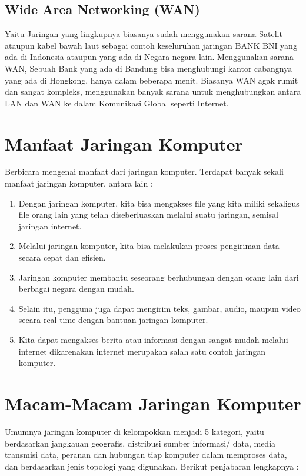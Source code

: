   \subsection{Wide Area Networking (WAN)}
    Yaitu Jaringan yang lingkupnya biasanya sudah menggunakan sarana Satelit ataupun kabel bawah laut sebagai contoh keseluruhan jaringan BANK BNI yang ada di Indonesia ataupun yang ada di Negara-negara lain. Menggunakan sarana WAN, Sebuah Bank yang ada di Bandung bisa menghubungi kantor cabangnya yang ada di Hongkong, hanya dalam beberapa menit. Biasanya WAN agak rumit dan sangat kompleks, menggunakan banyak sarana untuk menghubungkan antara LAN dan WAN ke dalam Komunikasi Global seperti Internet.

\section{Manfaat Jaringan Komputer}
  Berbicara mengenai manfaat dari jaringan komputer. Terdapat banyak sekali manfaat jaringan komputer, antara lain :
    \begin{enumerate}
      \item Dengan jaringan komputer, kita bisa mengakses file yang kita miliki sekaligus file orang lain yang telah diseberluaskan melalui suatu jaringan, semisal jaringan internet.
      \item Melalui jaringan komputer, kita bisa melakukan proses pengiriman data secara cepat dan efisien.
      \item Jaringan komputer membantu seseorang berhubungan dengan orang lain dari berbagai negara dengan mudah.
      \item Selain itu, pengguna juga dapat mengirim teks, gambar, audio, maupun video secara real time dengan bantuan jaringan komputer.
      \item Kita dapat mengakses berita atau informasi dengan sangat mudah melalui internet dikarenakan internet merupakan salah satu contoh jaringan komputer.
    \end{enumerate}

\section{Macam-Macam Jaringan Komputer}
  Umumnya jaringan komputer di kelompokkan menjadi 5 kategori, yaitu berdasarkan jangkauan geografis, distribusi sumber informasi/ data, media transmisi data, peranan dan hubungan tiap komputer dalam memproses data, dan berdasarkan jenis topologi yang digunakan. Berikut penjabaran lengkapnya :

